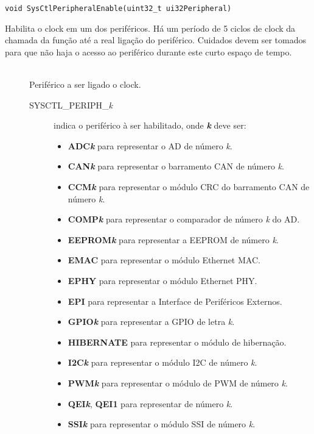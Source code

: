 \begin{lstlisting}[style=funcao]
	void SysCtlPeripheralEnable(uint32_t ui32Peripheral)
\end{lstlisting}

Habilita o clock em um dos periféricos. Há um período de 5 ciclos de clock da chamada da função até a real ligação do periférico. Cuidados devem ser tomados para que não haja o acesso ao periférico durante este curto espaço de tempo.

\begin{description}
	\item []\hfill \\
	Periférico a ser ligado o clock.
	\begin{description}
		\item [SYSCTL\_PERIPH\_\emph{k}] indica o periférico à ser habilitado, onde \textbf{\emph{k}} deve ser:
		\begin{itemize}
			\item \textbf{ADC\emph{k}} para representar o AD de número \emph{k}.
			\item \textbf{CAN\emph{k}} para representar o barramento CAN de número \emph{k}.
			\item \textbf{CCM\emph{k}} para representar o módulo CRC do barramento CAN de número \emph{k}.
			\item \textbf{COMP\emph{k}} para representar o comparador de número \emph{k} do AD.
			\item \textbf{EEPROM\emph{k}} para representar a EEPROM de número \emph{k}.
			\item \textbf{EMAC} para representar o módulo Ethernet MAC.
			\item \textbf{EPHY} para representar o módulo Ethernet PHY.
			\item \textbf{EPI} para representar a Interface de Periféricos Externos.
			\item \textbf{GPIO\emph{k}} para representar a GPIO de letra \emph{k}.
			\item \textbf{HIBERNATE} para representar o módulo de hibernação.
			\item \textbf{I2C\emph{k}} para representar o módulo I2C de número \emph{k}.
			\item \textbf{PWM\emph{k}} para representar o módulo de PWM de número \emph{k}.
			\item \textbf{QEI\emph{k}}, \textbf{QEI1} para representar  de número \emph{k}.
			\item \textbf{SSI\emph{k}} para representar o módulo SSI de número \emph{k}.

\end{itemize}
\end{description}
\end{description}
